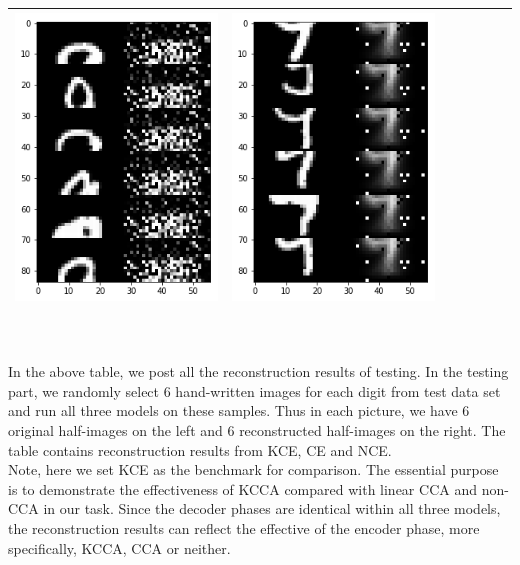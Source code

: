 \documentclass[12pt]{report} %
\begin{document}
\begin{tabular}{m{0.7cm}m{2.4cm}m{2.4cm}m{2.4cm}m{2.4cm}m{2.4cm}m{2.4cm}}
	\includegraphics[scale=0.3]{pictures/M2_9_up.png} & \includegraphics[scale=0.3]{pictures/M2_9_down.png}\\
	\bottomrule
\end{tabular}
\\
\\
In the above table, we post all the reconstruction results of testing. In the testing part, we randomly select 6 hand-written images for each digit from test data set and run all three models on these samples. Thus in each picture, we have 6 original half-images on the left and 6 reconstructed half-images on the right. The table contains reconstruction results from KCE, CE and NCE. \\
Note, here we set KCE as the benchmark for comparison. The essential purpose is to demonstrate the effectiveness of KCCA compared with linear CCA and non-CCA in our task. Since the decoder phases are identical within all three models, the reconstruction results can reflect the effective of the encoder phase, more specifically, KCCA, CCA or neither. \\
\end{document}
